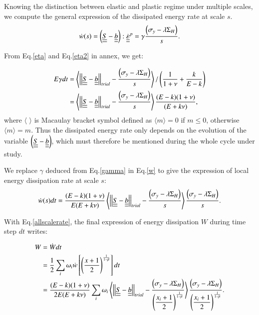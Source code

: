 \documentclass[3p,times,procedia,number]{elsarticle}
\begin{document}
Knowing the distinction between elastic and plastic regime under multiple scales, we compute the general expression of the dissipated energy rate at scale $s$.
\begin{equation}
\dot{w}(s)=\left( \uline{\uline{S}}-\uline{\uline{b}}\right) :\dot{\uline{\uline{\varepsilon}}}^p=\gamma\dfrac{  \left(\sigma_y-\lambda \Sigma_H\right)}{s}.
\label{w}
\end{equation}

From Eq.\eqref{eta} and Eq.\eqref{eta2} in annex, we get:

\begin{equation}
	\begin{split}
		E\gamma dt&=\left\langle \left| \left|\uline{\uline{S}}-\uline{\uline{b}}\right| \right|_{trial}-\dfrac{ \left(\sigma_y-\lambda \Sigma_H\right)}{s}\right\rangle /\left(\dfrac{1}{1+\nu}+\dfrac{k}{E-k} \right)
		\\&=\left\langle \left| \left|\uline{\uline{S}}-\uline{\uline{b}}\right| \right|_{trial}-\dfrac{ \left(\sigma_y-\lambda \Sigma_H\right)}{s}\right\rangle\dfrac{(E-k)(1+\nu) }{(E+k\nu)},
	\end{split}
	\label{gamma}
\end{equation}
where $\langle$ $\rangle$ is Macaulay bracket symbol defined as $\langle m\rangle=0$ if $m\leqslant0$, otherwise $\langle m\rangle=m$. Thus the dissipated energy rate only depends on the evolution of the variable $\left( \uline{\uline{S}}-\uline{\uline{b}}\right)$, which must therefore be mentioned during the whole cycle under study.

We replace $\gamma$ deduced from Eq.\eqref{gamma} in Eq.\eqref{w} to give the expression of local energy dissipation rate at scale $s$:
\begin{equation}
\dot{w}(s)dt=\dfrac{(E-k)(1+\nu) }{E(E+k\nu)}\left\langle  \left| \left|\uline{\uline{S}}-\uline{\uline{b}}\right| \right|_{trial}-\dfrac{ \left(\sigma_y-\lambda \Sigma_H\right)}{s}\right\rangle \dfrac{ \left(\sigma_y-\lambda \Sigma_H\right)}{s}.
\label{dW}
\end{equation}

With Eq.\eqref{allscalerate}, the final expression of energy dissipation $W$ during time step $dt$ writes:

\begin{equation}
\begin{split}
W&=\dot{W}dt
\\&=\frac{1}{2}\sum_{i}\omega_i\dot{w}\left[  \left( \frac{x+1}{2}\right) ^{\frac{1}{1-\beta}}\right]dt
\\&=\dfrac{(E-k)(1+\nu) }{2E(E+k\nu)}\sum_{i}\omega_i\left\langle  \left| \left|\uline{\uline{S}}-\uline{\uline{b}}\right| \right|_{trial}-\dfrac{\left(\sigma_y-\lambda \Sigma_H\right) }{\left( \dfrac{x_i+1}{2}\right) ^{\frac{1}{1-\beta}}}\right\rangle \dfrac{\left(\sigma_y-\lambda \Sigma_H\right) }{\left( \dfrac{x_i+1}{2}\right)^{\frac{1}{1-\beta}}}.
\end{split}
\label{finaldw}
\end{equation}
\end{document}
